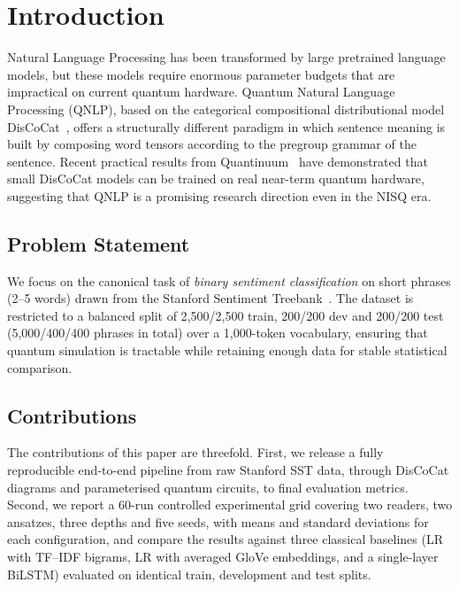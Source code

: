 \documentclass[runningheads]{llncs}
\begin{document}
\section{Introduction}\label{sec:intro}

Natural Language Processing has been transformed by large pretrained language
models, but these models require enormous parameter budgets that are
impractical on current quantum hardware. Quantum Natural Language Processing
(QNLP), based on the categorical compositional distributional model
DisCoCat~\cite{coecke2010}, offers a structurally different paradigm in which
sentence meaning is built by composing word tensors according to the
pregroup grammar of the sentence. Recent practical results from
Quantinuum~\cite{lorenz2021,kartsaklis2021} have demonstrated that small
DisCoCat models can be trained on real near-term quantum hardware,
suggesting that QNLP is a promising research direction even in the NISQ era.

\subsection{Problem Statement}

We focus on the canonical task of \emph{binary sentiment classification} on
short phrases (2--5 words) drawn from the Stanford Sentiment
Treebank~\cite{socher2013}. The dataset is restricted to a balanced split
of 2{,}500/2{,}500 train, 200/200 dev and 200/200 test (5{,}000/400/400
phrases in total) over a 1{,}000-token vocabulary, ensuring that quantum
simulation is tractable while retaining enough data for stable statistical
comparison.

\subsection{Contributions}

The contributions of this paper are threefold. First, we release a
fully reproducible end-to-end pipeline from raw Stanford SST data,
through DisCoCat diagrams and parameterised quantum circuits, to final
evaluation metrics. Second, we report a 60-run controlled experimental
grid covering two readers, two ansatzes, three depths and five seeds,
with means and standard deviations for each configuration, and compare
the results against three classical baselines (LR with TF--IDF bigrams,
LR with averaged GloVe embeddings, and a single-layer BiLSTM) evaluated
on identical train, development and test splits.
\end{document}
